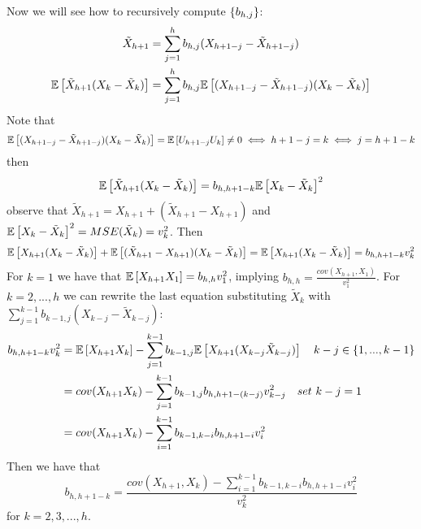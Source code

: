 Now we will see how to recursively compute $\left\{b_{h,j}\right\}$:
\begin{equation*}
    \begin{split}
        \tilde{X}_{h+1}&=\sum_{j=1}^{h}b_{h,j}(X_{h+1-j}-\tilde{X}_{h+1-j})\\
        \mathbb{E}\left[\tilde{X}_{h+1}(X_k-\tilde{X}_k)\right]&=\sum_{j=1}^hb_{h,j}\mathbb{E}\left[(X_{h+1-j}-\tilde{X}_{h+1-j})(X_k-\tilde{X}_k)\right]\\
    \end{split}
\end{equation*}
Note that
\[
    \mathbb{E}\left[(X_{h+1-j}-\tilde{X}_{h+1-j})(X_k-\tilde{X}_k)\right]=\mathbb{E}\left[U_{h+1-j}U_k\right]\ne0\iff h+1-j=k\iff j=h+1-k  
\]
then
\[
    \mathbb{E}\left[\tilde{X}_{h+1}(X_k-\tilde{X}_k)\right]=b_{h,h+1-k}\mathbb{E}\left[X_k-\tilde{X}_k\right]^2
\]
observe that $\tilde{X}_{h+1}=X_{h+1}+(\tilde{X}_{h+1}-X_{h+1})$ and $\mathbb{E}\left[X_k-\tilde{X}_k\right]^2=MSE(\tilde{X}_k)=v_k^2$. Then
\[
    \mathbb{E}\left[X_{h+1}(X_k-\tilde{X}_k)\right]+\mathbb{E}\left[(\tilde{X}_{h+1}-X_{h+1})(X_k-\tilde{X}_k)\right]=\mathbb{E}\left[X_{h+1}(X_k-\tilde{X}_k)\right]=b_{h,h+1-k}v_k^2  
\]
For $k=1$ we have that $\mathbb{E}\left[X_{h+1}X_1\right]=b_{h,h}v_1^2$, implying $b_{h,h}=\frac{cov(X_{h+1},X_1)}{v_1^2}$. For $k=2,...,h$ we can rewrite the last equation substituting $\tilde{X}_k$ with $\sum_{j=1}^{k-1}b_{k-1,j}(X_{k-j}-\tilde{X}_{k-j})$:
\begin{equation*}
    \begin{split}
        b_{h,h+1-k}v_k^2&=\expect{X_{h+1}X_k}-\sum_{j=1}^{k-1}b_{k-1,j}\expect{X_{h+1}(X_{k-j}\tilde{X}_{k-j})}\ \ \ k-j\in\set{1,...,k-1}\\
        &=cov(X_{h+1}X_k)-\sum_{j=1}^{k-1}b_{k-1,j}b_{h,h+1-(k-j)}v_{k-j}^2\ \ \ set\ k-j=1\\
        &=cov(X_{h+1}X_k)-\sum_{i=1}^{k-1}b_{k-1,k-i}b_{h,h+1-i}v_i^2\\
    \end{split}
\end{equation*}
Then we have that 
\[
    b_{h,h+1-k}=\frac{cov(X_{h+1},X_k)-\sum_{i=1}^{k-1}b_{k-1,k-i}b_{h,h+1-i}v_i^2}{v_k^2}
\]
for $k=2,3,...,h$.

